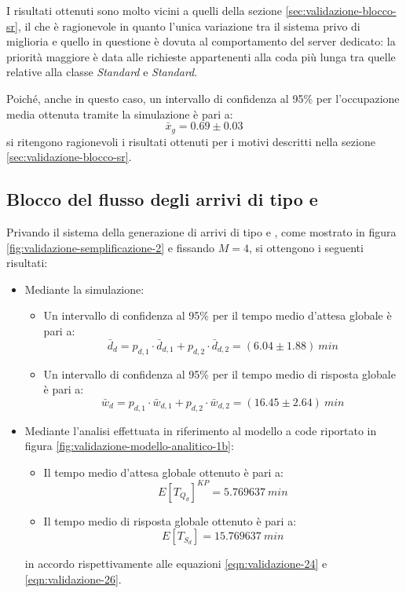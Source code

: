 I risultati ottenuti sono molto vicini a quelli della sezione \ref{sec:validazione-blocco-sr}, il che è ragionevole in quanto l'unica variazione tra il sistema privo di miglioria e quello in questione è dovuta al comportamento del server dedicato: la priorità maggiore è data alle richieste appartenenti alla coda più lunga tra quelle relative alla classe \uo{} \textsl{Standard} e \pp{} \textsl{Standard}.

Poiché, anche in questo caso, un intervallo di confidenza al 95\% per l'occupazione media ottenuta tramite la simulazione è pari a:
\begin{equation}
\bar{x}_g = 0.69 \pm 0.03
\end{equation}
si ritengono ragionevoli i risultati ottenuti per i motivi descritti nella sezione \ref{sec:validazione-blocco-sr}.

\subsection{Blocco del flusso degli arrivi di tipo \uo{} e \pp{}}
Privando il sistema della generazione di arrivi di tipo \uo{} e \pp{}, come mostrato in figura \ref{fig:validazione-semplificazione-2} e fissando $M = 4$, si ottengono i seguenti risultati:
\begin{itemize}
\item Mediante la simulazione:
\begin{itemize}
\item Un intervallo di confidenza al 95\% per il tempo medio d'attesa globale è pari a:
\begin{equation} 
\bar{d}_d = p_{d,1}\cdot \bar{d}_{d,1} + p_{d,2}\cdot \bar{d}_{d,2} = (6.04 \pm 1.88)\ min
\end{equation}
\item Un intervallo di confidenza al 95\% per il tempo medio di risposta globale è pari a:
\begin{equation}
\bar{w}_d = p_{d,1}\cdot \bar{w}_{d,1} + p_{d,2}\cdot \bar{w}_{d,2} = (16.45 \pm 2.64)\ min
\end{equation}
\end{itemize}

\item Mediante l'analisi effettuata in riferimento al modello a code riportato in figura \ref{fig:validazione-modello-analitico-1b}:
\begin{itemize}
\item Il tempo medio d'attesa globale ottenuto è pari a:
\begin{equation}
E[T_{Q_d}]^{KP} = 5.769637\ min 
\end{equation}
\item Il tempo medio di risposta globale ottenuto è pari a:
\begin{equation}
E[T_{S_d}] = 15.769637\ min 
\end{equation}
\end{itemize}
in accordo rispettivamente alle equazioni \ref{eqn:validazione-24} e \ref{eqn:validazione-26}.
\end{itemize}

